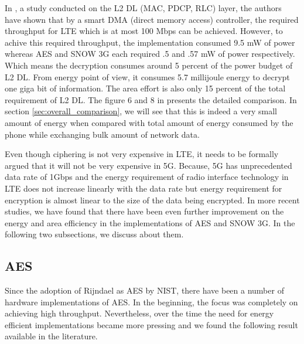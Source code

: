 In \cite{IIS_Ruhr_2010}, a study conducted on the L2 DL (MAC, PDCP, RLC) layer, the authors have shown that by a smart DMA (direct memory access) controller, the required throughput for LTE which is at most 100 Mbps can be achieved. However, to achive this required throughput, the implementation consumed 9.5 mW of power whereas AES and SNOW 3G each required .5 and .57 mW of power respectively. Which means the decryption consumes around 5 percent of the power budget of L2 DL. From energy point of view, it consumes 5.7 millijoule energy to decrypt one giga bit of information. The area effort is also only 15 percent of the total requirement of L2 DL. The figure 6 and 8 in \cite{IIS_Ruhr_2010} presents the detailed comparison. In section \ref{sec:overall_comparison}, we will see that this is indeed a very small amount of energy when compared with total amount of energy consumed by the phone while exchanging bulk amount of network data.


Even though ciphering is not very expensive in LTE, it needs to be formally argued that it will not be very expensive in 5G. Because, 5G has unprecedented data rate of 1Gbps and the energy requirement of radio interface technology in LTE does not increase linearly with the data rate but energy requirement for encryption is almost linear to the size of the data being encrypted. In more recent studies, we have found that there have been even further improvement on the energy and area efficiency in the implementations of AES and SNOW 3G. In the following two subsections, we discuss about them.

\subsection{AES} Since the adoption of Rijndael as AES by NIST, there have been a number of hardware implementations of AES. In the beginning, the focus was completely on achieving high throughput. Nevertheless, over the time the need for energy efficient implementations became more pressing and we found the following result available in the literature. \newline

